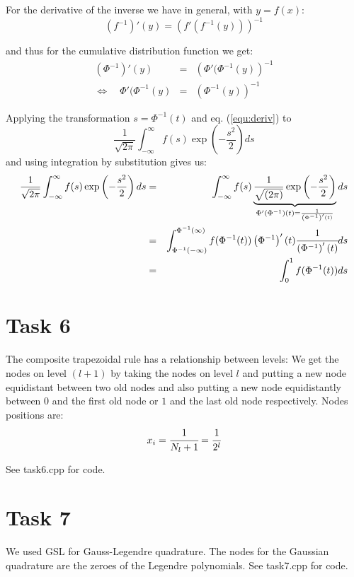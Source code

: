 \documentclass[]{article}
\begin{document}
For the derivative of the inverse we have in general, with $y = f(x)$:
\[\left(f^{-1}\right)'(y) = \left(f'\left(f^{-1}(y)\right)\right)^{-1}\]

and thus for the cumulative distribution function we get:
\begin{eqnarray}
\left(\Phi^{-1}\right)'(y) & = &
\left(\Phi'(\Phi^{-1}(y)\right)^{-1} \nonumber\\
\Leftrightarrow \quad \Phi'(\Phi^{-1}(y) & = & \left(\Phi^{-1}(y)\right)^{-1}
\label{equ:deriv}
\end{eqnarray}

Applying the transformation $s = \Phi^{-1}(t)$ and eq. (\ref{equ:deriv}) to 
\[\dfrac{1}{\sqrt{2\pi}}\int_{-\infty}^{\infty}f(s)\exp\left({-\dfrac{s^2}{2}}\right)ds\]
and using integration by substitution gives us:
\begin{eqnarray*}
\dfrac{1}{\sqrt{2\pi}}\int_{-\infty}^{\infty}f(s)\exp\left({-\dfrac{s^2}{2}}\right)ds
& = &
\int_{-\infty}^{\infty}f(s)\underbrace{\dfrac{1}{\sqrt{(2\pi)}}\exp\left({-\dfrac{s^2}{2}}\right)}_{\Phi'(\Phi^{-1})(t)
= \frac{1}{\left(\Phi^{-1}\right)'(t)}}ds \\
& =
&\int_{\Phi^{-1}(-\infty)}^{\Phi^{-1}(\infty)}f(\Phi^{-1}(t))\left(\Phi^{-1}\right)'(t)\cfrac{1}{\left(\Phi^{-1}\right)'(t)}ds
\\
& = &
\int_{0}^{1}f(\Phi^{-1}(t))ds
\end{eqnarray*}

\section*{Task 6} The composite trapezoidal rule has a relationship between levels: We get the
nodes on level $(l+1)$ by taking the nodes on level $l$ and putting a new node
equidistant between two old nodes and also putting a new node equidistantly
between $0$ and the first old node or $1$ and the last old node respectively.
Nodes positions are:
\begin{eqnarray*}
x_i = \cfrac{1}{N_l+1} = \cfrac{1}{2^l}
\end{eqnarray*}

See task6.cpp for code.

\section*{Task 7}
We used GSL for Gauss-Legendre quadrature. The nodes for
the Gaussian quadrature are the zeroes of the Legendre polynomials. See task7.cpp for code.
\end{document}
